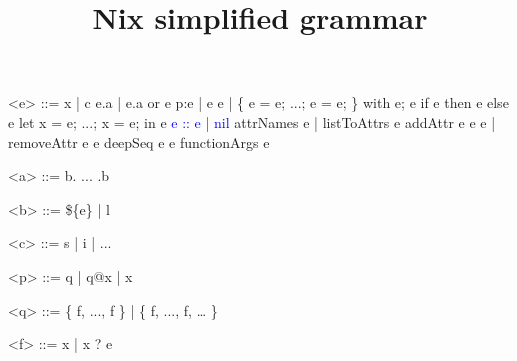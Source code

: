 \documentclass{article}
\title{Nix simplified grammar}
\date{}
\begin{document}
\maketitle{}

\begin{grammar}
<e> ::=
    x | c
  \alt e.a | e.a or e
  \alt p:e | e e
  \alt [ e ... e ] | \{ e = e; ...; e = e; \}
  \alt with e; e
  \alt if e then e else e
  \alt let x = e; ...; x = e; in e
  \textcolor{blue}{\alt e :: e | nil}
  \alt attrNames e | listToAttrs e
  \alt addAttr e e e | removeAttr e e
  \alt deepSeq e e
  \alt functionArgs e

<a> ::= b. ... .b

<b> ::= \$\{e\} | l

<c> ::= s | i | ...

<p> ::= q | q@x | x

<q> ::= \{ f, ..., f \} | \{ f, ..., f, … \}

<f> ::= x | x ? e

\end{grammar}
\end{document}
